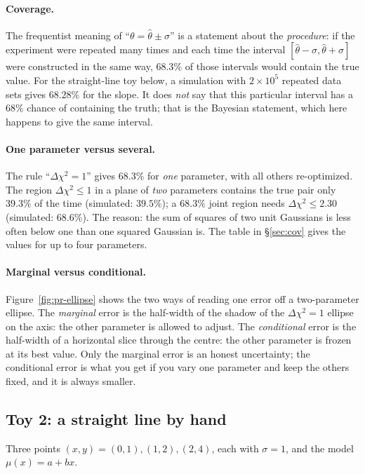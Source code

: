 \documentclass[11pt,a4paper]{article}
\numberwithin{equation}{section}
\theoremstyle{definition}
\theoremstyle{plain}
\theoremstyle{remark}
\numberwithin{algorithm}{section}
\begin{document}
\paragraph{Coverage.} The frequentist meaning of ``$\theta=\hat\theta\pm\sigma$'' is a statement about the \emph{procedure}: if the experiment were repeated many times and each time the interval $[\hat\theta-\sigma,\hat\theta+\sigma]$ were constructed in the same way, $68.3\%$ of those intervals would contain the true value. For the straight-line toy below, a simulation with $2\times10^5$ repeated data sets gives $68.28\%$ for the slope. It does \emph{not} say that this particular interval has a $68\%$ chance of containing the truth; that is the Bayesian statement, which here happens to give the same interval.

\paragraph{One parameter versus several.} The rule ``$\Delta\chi^2=1$'' gives $68.3\%$ for \emph{one} parameter, with all others re-optimized. The region $\Delta\chi^2\le1$ in a plane of \emph{two} parameters contains the true pair only $39.3\%$ of the time (simulated: $39.5\%$); a $68.3\%$ joint region needs $\Delta\chi^2\le2.30$ (simulated: $68.6\%$). The reason: the sum of squares of two unit Gaussians is less often below one than one squared Gaussian is. The table in \S\ref{sec:cov} gives the values for up to four parameters.

\paragraph{Marginal versus conditional.} Figure~\ref{fig:pr-ellipse} shows the two ways of reading one error off a two-parameter ellipse. The \emph{marginal} error is the half-width of the shadow of the $\Delta\chi^2=1$ ellipse on the axis: the other parameter is allowed to adjust. The \emph{conditional} error is the half-width of a horizontal slice through the centre: the other parameter is frozen at its best value. Only the marginal error is an honest uncertainty; the conditional error is what you get if you vary one parameter and keep the others fixed, and it is always smaller.

\subsection{Toy 2: a straight line by hand}\label{sec:pr-line}
Three points $(x,y)=(0,1),(1,2),(2,4)$, each with $\sigma=1$, and the model $\mu(x)=a+bx$.
\end{document}
